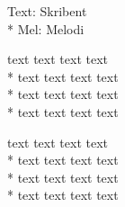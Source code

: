 

\pagestyle{Example Kaptiel}


\begin{SongText}[Låtnamn]
    \begin{SongInfo}
        Text: Skribent\\*%
        Mel: Melodi
    \end{SongInfo}
    \begin{Verse}
        text text text text\\*%
        text text text text\\*%
        text text text text\\*%
        text text text text
    \end{Verse}
    \begin{Verse}
        text text text text\\*%
        text text text text\\*%
        text text text text\\*%
        text text text text 
    \end{Verse}
\end{SongText}
\newpage